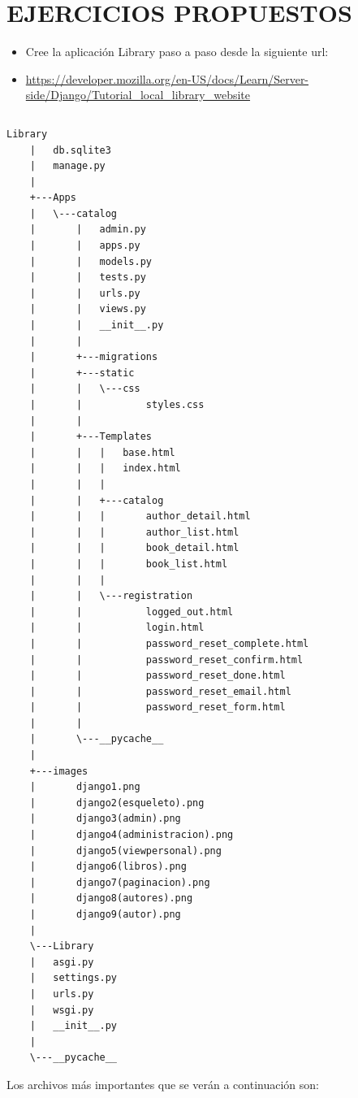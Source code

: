\documentclass[12]{article}
\begin{document}
	\section{EJERCICIOS PROPUESTOS}
	
	\lstlistoflistings
	\begin{itemize}
		\item Cree la aplicación Library paso a paso desde la siguiente url:
		\item \url{https://developer.mozilla.org/en-US/docs/Learn/Server-side/Django/Tutorial_local_library_website}
		\begin{Verbatim}[xleftmargin=\parindent]
		\end{Verbatim}
	\end{itemize}
	\newpage
	\begin{lstlisting}[caption={Estructura de los repositorios y archivos}, style=mystyle]
	Library
	|   db.sqlite3
	|   manage.py
	|
	+---Apps
	|   \---catalog
	|       |   admin.py
	|       |   apps.py
	|       |   models.py
	|       |   tests.py
	|       |   urls.py
	|       |   views.py
	|       |   __init__.py
	|       |
	|       +---migrations
	|       +---static
	|       |   \---css
	|       |           styles.css
	|       |
	|       +---Templates
	|       |   |   base.html
	|       |   |   index.html
	|       |   |
	|       |   +---catalog
	|       |   |       author_detail.html
	|       |   |       author_list.html
	|       |   |       book_detail.html
	|       |   |       book_list.html
	|       |   |
	|       |   \---registration
	|       |           logged_out.html
	|       |           login.html
	|       |           password_reset_complete.html
	|       |           password_reset_confirm.html
	|       |           password_reset_done.html
	|       |           password_reset_email.html
	|       |           password_reset_form.html
	|       |
	|       \---__pycache__
	|
	+---images
	|       django1.png
	|       django2(esqueleto).png
	|       django3(admin).png
	|       django4(administracion).png
	|       django5(viewpersonal).png
	|       django6(libros).png
	|       django7(paginacion).png
	|       django8(autores).png
	|       django9(autor).png
	|
	\---Library
	|   asgi.py
	|   settings.py
	|   urls.py
	|   wsgi.py
	|   __init__.py
	|
	\---__pycache__
	\end{lstlisting}
	\newpage
	Los archivos más importantes que se verán a continuación son:
\end{document}
